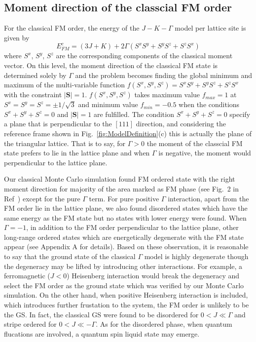 \documentclass[aps,prb,reprint,amsfonts,amsmath,amssymb,showpacs,groupedaddress,superscriptaddress]{revtex4-1}
\begin{document}
\subsection{\label{sec:SectionIIIA}Moment direction of the classcial FM order}
For the classical FM order, the energy of the $J-K-\Gamma$ model per lattice site is given by
\begin{equation}
    E_{FM}^{c} = (3J + K) + 2 \Gamma (S^x S^y + S^y S^z + S^z S^x) \label{eq:EcFM}
\end{equation}
where $S^x$, $S^y$, $S^z$ are the corresponding components of the classical moment vector. On this level, the moment direction of the classical FM state is determined solely by $\Gamma$ and the problem becomes finding the global minimum and maximum of the multi-variable function $f(S^x, S^y, S^z) = S^xS^y + S^yS^z + S^zS^x$ with the constraint $|\bm{S}| = 1$. $f(S^x, S^y, S^z)$ takes maximum value $f_{max}=1$ at $S^x=S^y=S^z=\pm 1/\sqrt{3}$ and minimum value $f_{min}=-0.5$ when the conditions $S^x + S^y + S^z = 0$ and $|\bm{S}| = 1$ are fulfilled. The condition $S^x + S^y + S^z = 0$ specify a plane that is perpendicular to the $[111]$ direction, and considering the reference frame shown in Fig.~\ref{fig:ModelDefinition}(c) this is actually the plane of the triangular lattice. That is to say, for $\Gamma > 0$ the moment of the classcial FM state prefers to lie in the lattice plane and when $\Gamma$ is negative, the moment would perpendicular to the lattice plane.

Our classical Monte Carlo simulation found FM ordered state with the right moment direction for majority of the area marked as FM phase (see Fig.~2 in Ref~) except for the pure $\Gamma$ term. For pure positive $\Gamma$ interaction, apart from the FM order lie in the lattice plane, we also found disordered states which have the same energy as the FM state but no states with lower energy were found. When $\Gamma=-1$, in addition to the FM order perpendicular to the lattice plane, other long-range ordered states which are energetically degenerate with the FM state appear (see Appendix A for details). Based on these observation, it is reasonable to say that the ground state of the classical $\Gamma$ model is highly degenerate though the degeneracy may be lifted by introducing other interactions. For example, a ferromagnetic ($J<0$) Heisenberg interaction would break the degeneracy and select the FM order as the ground state which was verified by our Monte Carlo simulation. On the other hand, when positive Heisenberg interaction is included, which introduces further frustation to the system, the FM order is unlikely to be the GS. In fact, the classical GS were found to be disordered for $0 < J \ll \Gamma$ and stripe ordered for $0 < J \ll -\Gamma$. As for the disordered phase, when quantum flucations are involved, a quantum spin liquid state may emerge.
\end{document}
